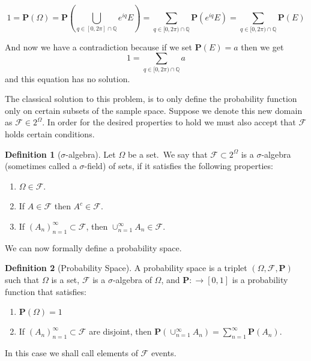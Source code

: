\documentclass[11pt,a4paper]{article}
\theoremstyle{definition}
\newtheorem{definition}{Definition}[section]
\theoremstyle{plain}
\newcommand{\Q}{\mathbb{Q}}
\begin{document}
  \[
    1 = \mathbf P(\Omega) = 
    \mathbf P\left({\bigcup_{q \in [0,2\pi] \cap \Q}}{e^{i q} E}\right) = 
    \sum_{q \in [0,2\pi) \cap \Q}{\mathbf P(e^{i q} E)} = 
    \sum_{q \in [0,2\pi) \cap \Q}{\mathbf P(E)}
  \]

  And now we have a contradiction because if we set $\mathbf P(E) = a$ then
  we get
  \[ 1 = \sum_{q \in [0,2\pi) \cap \Q}{a} \]
  and this equation has no solution.

  The classical solution to this problem, is to only define the probability
  function only on certain subsets of the sample space. Suppose we denote
  this new domain as $\mathcal F \in 2^\Omega$. In order for the desired
  properties to hold we must also accept that $\mathcal F$ holds certain
  conditions.

  \begin{definition}[$\sigma$-algebra]
    Let $\Omega$ be a set.\ We say that $\mathcal F \subset 2^\Omega$ is a
    $\sigma$-algebra (sometimes called a $\sigma$-field) of sets, if it
    satisfies the following properties:
    \begin{enumerate}
      \item $\Omega \in \mathcal F$.
      \item If $A \in \mathcal F$ then $A^c \in \mathcal F$.
      \item If $(A_n)_{n=1}^{\infty} \subset \mathcal F$, then
        $\cup_{n=1}^{\infty}{A_n} \in \mathcal F$.
    \end{enumerate}
  \end{definition}

  We can now formally define a probability space.

  \begin{definition}[Probability Space]
    A probability space is a triplet $(\Omega, \mathcal F, \mathbf P)$ such
    that $\Omega$ is a set, $\mathcal F$ is a $\sigma$-algebra of $\Omega$,
    and $\mathbf P \colon \mathcal \to [0,1]$ is a probability function that
    satisfies:
    \begin{enumerate}
      \item $\mathbf P(\Omega) = 1$
      \item If $(A_n)_{n=1}^{\infty} \subset \mathcal F$ are disjoint, then
        $\mathbf P\left(\cup_{n=1}^{\infty}{A_n}\right) = 
        \sum_{n=1}^{\infty}{\mathbf P(A_n)}$.
    \end{enumerate}
  \end{definition}

  In this case we shall call elements of $\mathcal F$ events.
\end{document}
